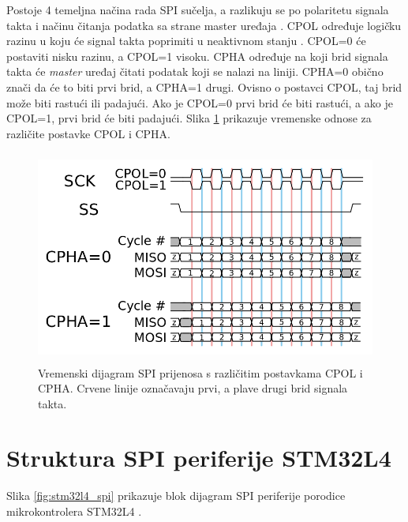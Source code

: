 		Postoje 4 temeljna načina rada  SPI sučelja, a razlikuju se po polaritetu signala takta  i  načinu čitanja podatka sa strane master uređaja . CPOL određuje logičku razinu u koju će signal takta poprimiti u neaktivnom stanju . CPOL=0 će postaviti nisku razinu, a CPOL=1 visoku. CPHA određuje na koji brid signala takta će \textit{master} uređaj čitati podatak koji se nalazi na liniji. CPHA=0 obično znači da će to biti prvi brid, a CPHA=1 drugi. Ovisno o postavci CPOL, taj brid može biti rastući ili padajući. Ako je CPOL=0 prvi brid će biti rastući, a ako je CPOL=1, prvi brid će biti padajući. Slika \ref{fig:spi_cpol_cpha} prikazuje vremenske odnose za različite postavke CPOL i CPHA.
		
		\begin{figure}[htb]
			\centering
			\includegraphics[height=7cm]{slike/spi_cpol_cpha.png}
			\caption{Vremenski dijagram SPI prijenosa s različitim postavkama CPOL i CPHA. Crvene linije označavaju prvi, a plave drugi brid  signala takta. \cite{spi_wikipedia}}
			\label{fig:spi_cpol_cpha}
		\end{figure}
		
	\section{Struktura SPI periferije STM32L4}
		Slika \ref{fig:stm32l4_spi} prikazuje blok dijagram SPI periferije porodice mikrokontrolera STM32L4 \cite{stm32l4_manual}.
	

